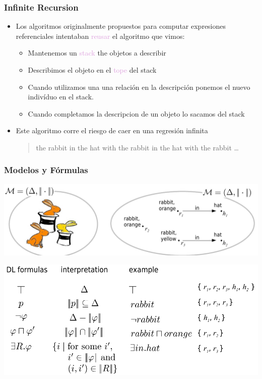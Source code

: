 \documentclass[compress,color=usenames]{beamer}
\newcommand{\mH}[1]{\textcolor{Plum}{#1}}
\begin{document}
\begin{frame}
\frametitle{Infinite Recursion}

\begin{itemize}

\item Los algoritmos originalmente propuestos para computar expresiones referenciales 
intentaban \mH{reusar} el algoritmo que vimos:

\begin{itemize}
\item Mantenemos un \mH{stack} the objetos a describir
\item Describimos el objeto en el \mH{tope} del stack
\item Cuando utilizamos una una relaci\'on en la descripci\'on ponemos el nuevo indiv\'iduo 
en el stack. 
\item Cuando completamos la descripcion de un objeto lo sacamos del stack\pause

\end{itemize}

\item Este algoritmo corre el riesgo de caer en una regresi\'on infinita
\begin{quote}
the rabbit in the hat with the rabbit in the hat with the rabbit \ldots
\end{quote}
\end{itemize}

\end{frame}

\begin{frame}
\frametitle{Modelos y F\'ormulas}

\begin{center}
\includegraphics[scale=.25]{pics/modelo1.jpg}
\end{center}\pause

\begin{center}
\includegraphics[scale=.25]{pics/modelo2.jpg}
\end{center}

\end{frame}
\end{document}
